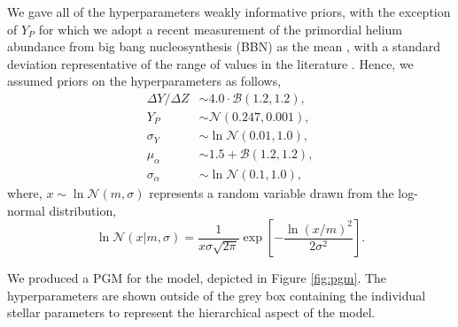 \documentclass[a4paper,fleqn,usenatbib]{mnras}
\begin{document}
We gave all of the hyperparameters weakly informative priors, with the exception of $Y_P$ for which we adopt a recent measurement of the primordial helium abundance from big bang nucleosynthesis (BBN) as the mean \citep{Pitrou.Coc.ea2018}, with a standard deviation representative of the range of values in the literature \citep{Aver.Olive.ea2015, Peimbert.Peimbert.ea2016, Cooke.Fumagalli2018}. Hence, we assumed priors on the hyperparameters as follows,
%
\begin{align*}
    {\Delta Y}/{\Delta Z} &\sim 4.0\cdot\mathcal{B}(1.2, 1.2),\\
    Y_P &\sim \mathcal{N}(0.247, 0.001),\\
    \sigma_Y &\sim \ln\mathcal{N}(0.01, 1.0),\\
    \mu_\alpha &\sim 1.5 + \mathcal{B}(1.2, 1.2),\\
    \sigma_\alpha &\sim \ln\mathcal{N}(0.1, 1.0),
\end{align*}
%
where, $x \sim \ln\mathcal{N}(m, \sigma)$ represents a random variable drawn from the log-normal distribution,
%
\begin{equation}
    \ln\mathcal{N}(x | m, \sigma)=  \frac{1}{x \sigma \sqrt{2 \pi}} \exp \left[ - \frac{\ln (x / m)^{2}}{2 \sigma^{2}}\right].
\end{equation}
%

We produced a PGM for the model, depicted in Figure \ref{fig:pgm}. The hyperparameters are shown outside of the grey box containing the individual stellar parameters to represent the hierarchical aspect of the model.
\end{document}
